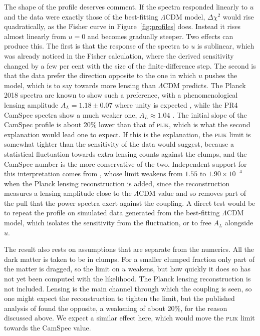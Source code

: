 \documentclass[11pt,a4paper]{article}
\newcommand{\dchi}{\Delta\chi^2}
\begin{document}
The shape of the profile deserves comment. If the spectra responded linearly to $u$ and the data were exactly those of the best-fitting $\Lambda$CDM model, $\dchi$ would rise quadratically, as the Fisher curve in Figure~\ref{fig:profiles} does. Instead it rises almost linearly from $u = 0$ and becomes gradually steeper. Two effects can produce this. The first is that the response of the spectra to $u$ is sublinear, which was already noticed in the Fisher calculation, where the derived sensitivity changed by a few per cent with the size of the finite-difference step. The second is that the data prefer the direction opposite to the one in which $u$ pushes the model, which is to say towards more lensing than $\Lambda$CDM predicts. The Planck 2018 spectra are known to show such a preference, with a phenomenological lensing amplitude $A_L = 1.18 \pm 0.07$ where unity is expected \citep{Planck2018VI}, while the PR4 CamSpec spectra show a much weaker one, $A_L \approx 1.04$ \citep{Rosenberg2022}. The initial slope of the CamSpec profile is about 20\% lower than that of \textsc{plik}, which is what the second explanation would lead one to expect. If this is the explanation, the \textsc{plik} limit is somewhat tighter than the sensitivity of the data would suggest, because a statistical fluctuation towards extra lensing counts against the clumps, and the CamSpec number is the more conservative of the two. Independent support for this interpretation comes from \citet{Zhou2022}, whose limit weakens from $1.55$ to $1.90\times10^{-4}$ when the Planck lensing reconstruction is added, since the reconstruction measures a lensing amplitude close to the $\Lambda$CDM value and so removes part of the pull that the power spectra exert against the coupling. A direct test would be to repeat the profile on simulated data generated from the best-fitting $\Lambda$CDM model, which isolates the sensitivity from the fluctuation, or to free $A_L$ alongside $u$.

The result also rests on assumptions that are separate from the numerics. All the dark matter is taken to be in clumps. For a smaller clumped fraction only part of the matter is dragged, so the limit on $u$ weakens, but how quickly it does so has not yet been computed with the likelihood. The Planck lensing reconstruction is not included. Lensing is the main channel through which the coupling is seen, so one might expect the reconstruction to tighten the limit, but the published analysis of \citet{Zhou2022} found the opposite, a weakening of about 20\%, for the reason discussed above. We expect a similar effect here, which would move the \textsc{plik} limit towards the CamSpec value. 
\end{document}
